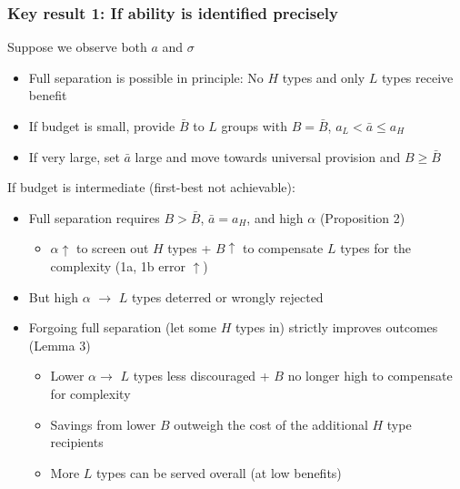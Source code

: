 \documentclass[aspectratio=169]{beamer}
\begin{document}
\begin{frame}
\frametitle{Key result 1: If ability is identified precisely}
Suppose we observe both $a$ and $\sigma$
\begin{itemize}\setlength\itemsep{3pt}
\item Full separation is possible in principle: No $H$ types and only $L$ types receive benefit
\item If budget is small, provide $\bar{B}$ to $L$ groups with $B=\bar{B}$, $a_L<\bar{a}\leq a_H$
\item If very large, set $\bar{a}$ large and move towards universal provision and $B\geq \bar{B}$
\end{itemize}\medskip
If budget is intermediate (first-best not achievable):
\begin{itemize}\setlength\itemsep{3pt}
\item Full separation requires $B>\bar{B}$, $\bar{a}=a_H$, and high $\alpha$ (Proposition 2)
    \begin{itemize}\setlength\itemsep{3pt}
        \item $\alpha\uparrow$ to screen out $H$ types +  $B\uparrow$  to compensate $L$ types for the complexity (1a, 1b error $\uparrow$)
    \end{itemize}
    \item But high $\alpha$ $\to$ $L$ types deterred or wrongly rejected
    \item Forgoing full separation (let some $H$ types in) strictly 
    improves outcomes (Lemma 3)
    \begin{itemize}\setlength\itemsep{3pt}
        \item Lower $\alpha\to$ $L$ types less discouraged + $B$ no longer high to compensate for complexity
        \item Savings from lower $B$ outweigh the cost of the additional $H$ type recipients
        \item More $L$ types can be served overall (at low benefits)
    \end{itemize}
\end{itemize}
\end{frame}
\end{document}
